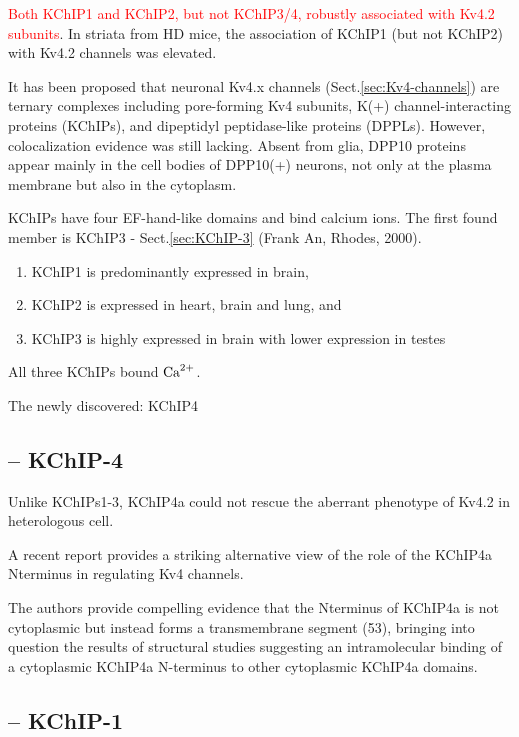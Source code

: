 \textcolor{red}{Both KChIP1 and KChIP2, but not KChIP3/4, robustly associated
with Kv4.2 subunits}. In striata from HD mice, the association of KChIP1 (but
not KChIP2) with Kv4.2 channels was elevated.

It has been proposed that neuronal Kv4.x channels (Sect.\ref{sec:Kv4-channels})
are ternary complexes including pore-forming Kv4 subunits, K(+)
channel-interacting proteins (KChIPs), and dipeptidyl peptidase-like proteins
(DPPLs). However, colocalization evidence was still lacking. 
Absent from glia, DPP10 proteins appear mainly in the cell bodies of DPP10(+)
neurons, not only at the plasma membrane but also in the cytoplasm.


KChIPs have four EF-hand-like domains and bind calcium ions. The first found
member is KChIP3 - Sect.\ref{sec:KChIP-3} (Frank An, Rhodes, 2000).
\begin{enumerate}
  \item  KChIP1 is predominantly expressed in brain, 
  
  \item KChIP2 is expressed in heart, brain and lung, and 
  
  \item KChIP3 is highly expressed in brain with lower expression in testes
  
\end{enumerate}
All three KChIPs bound ${\text{Ca}^{2+}}$.

The newly discovered: KChIP4


\subsection{-- KChIP-4}
\label{sec:KChIP-4}


Unlike KChIPs1-3, KChIP4a could not rescue the aberrant phenotype of Kv4.2 in
heterologous cell.

A recent report provides a striking alternative view of the role of the KChIP4a
Nterminus in regulating Kv4 channels.

The authors provide compelling evidence that the Nterminus of KChIP4a is not
cytoplasmic but instead forms a transmembrane segment (53), bringing into
question the results of structural studies suggesting an intramolecular binding
of a cytoplasmic KChIP4a N-terminus to other cytoplasmic KChIP4a domains. 



\subsection{-- KChIP-1}
\label{sec:KChIP-1}

